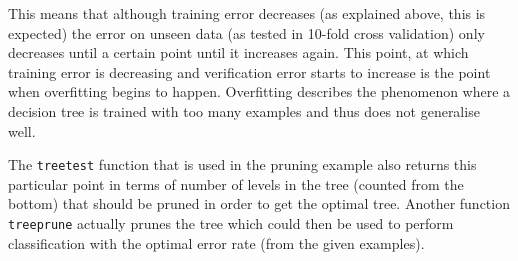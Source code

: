 \documentclass[10pt,a4paper]{article}
\begin{document}
This means that although training error decreases (as explained above, this is expected) the error on unseen data (as tested in 10-fold cross validation) only decreases until a certain point until it increases again. This point, at which training error is decreasing and verification error starts to increase is the point when overfitting begins to happen. Overfitting describes the phenomenon where a decision tree is trained with too many examples and thus does not generalise well.

The \texttt{treetest} function that is used in the pruning example also returns this particular point in terms of number of levels in the tree (counted from the bottom) that should be pruned in order to get the optimal tree. Another function \texttt{treeprune} actually prunes the tree which could then be used to perform classification with the optimal error rate (from the given examples).
\end{document}
